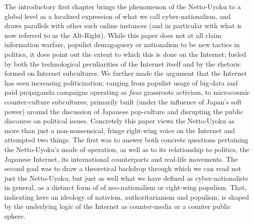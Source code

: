 \documentclass[10pt,british,A4paper,twoside]{memoir}
\begin{document}
The introductory first chapter brings the phenomenon of the Netto-Uyoku
to a global level as a localized expression of what we call
cyber-nationalism, and draws parallels with other such online instances
(and in particular with what is now referred to as the Alt-Right). While
this paper does not at all claim information warfare, populist
demagoguery or nationalism to be new tactics in politics, it does point
out the extent to which this is done on the Internet; fueled by both the
technological peculiarities of the Internet itself and by the rhetoric
formed on Internet subcultures. We further made the argument that the
Internet has seen increasing politicization; ranging from populist usage
of big-data and paid propaganda campaigns operating as \emph{faux}
grassroots activism, to microcosmic counter-culture subcultures;
primarily built (under the influence of Japan's soft power) around the
discussion of Japanese pop-culture and disrupting the public discourse
on political issues. Concretely this paper views the Netto-Uyoku as more
than just a non-nonsensical, fringe right-wing voice on the Internet and
attempted two things. The first was to answer both concrete questions
pertaining the Netto-Uyoku's mode of operation, as well as to its
relationship to politics, the Japanese Internet, its international
counterparts and real-life movements. The second goal was to draw a
theoretical backdrop through which we can read not just the Netto-Uyoku,
but just as well what we have defined as cyber-nationalists in general,
as a distinct form of of neo-nationalism or right-wing populism. That,
indicating here an ideology of nativism, authoritarianism and populism, is
shaped by the underlying logic of the Internet as counter-media or a
counter public sphere.
\end{document}
